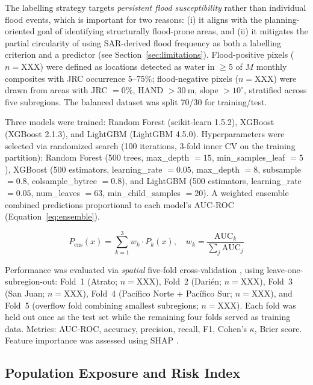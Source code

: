 \documentclass{article}
\begin{document}
The labelling strategy targets \textit{persistent flood susceptibility} rather than individual flood events, which is important for two reasons: (i) it aligns with the planning-oriented goal of identifying structurally flood-prone areas, and (ii) it mitigates the partial circularity of using SAR-derived flood frequency as both a labelling criterion and a predictor (see Section~\ref{sec:limitations}). Flood-positive pixels ($n = \text{XXX}$) were defined as locations detected as water in $\geq$5 of $M$ monthly composites with JRC occurrence 5--75\%; flood-negative pixels ($n = \text{XXX}$) were drawn from areas with JRC $= 0\%$, HAND $> \SI{30}{\metre}$, slope $> 10^{\circ}$, stratified across five subregions. The balanced dataset was split 70/30 for training/test.

Three models were trained: Random Forest \citep{Breiman2001} (scikit-learn 1.5.2), XGBoost \citep{Chen2016} (XGBoost 2.1.3), and LightGBM \citep{Ke2017} (LightGBM 4.5.0). Hyperparameters were selected via randomized search (100 iterations, 3-fold inner CV on the training partition): Random Forest (500 trees, max\_depth $= 15$, min\_samples\_leaf $= 5$), XGBoost (500 estimators, learning\_rate $= 0.05$, max\_depth $= 8$, subsample $= 0.8$, colsample\_bytree $= 0.8$), and LightGBM (500 estimators, learning\_rate $= 0.05$, num\_leaves $= 63$, min\_child\_samples $= 20$). A weighted ensemble combined predictions proportional to each model's AUC-ROC (Equation~\ref{eq:ensemble}).

\begin{equation}
    P_{\text{ens}}(x) = \sum_{k=1}^{3} w_k \cdot P_k(x), \quad w_k = \frac{\text{AUC}_k}{\sum_{j} \text{AUC}_j}
    \label{eq:ensemble}
\end{equation}

Performance was evaluated via \textit{spatial} five-fold cross-validation \citep{Roberts2017}, using leave-one-subregion-out: Fold~1 (Atrato; $n = \text{XXX}$), Fold~2 (Dari\'en; $n = \text{XXX}$), Fold~3 (San Juan; $n = \text{XXX}$), Fold~4 (Pac\'ifico Norte + Pac\'ifico Sur; $n = \text{XXX}$), and Fold~5 (overflow fold combining smallest subregions; $n = \text{XXX}$). Each fold was held out once as the test set while the remaining four folds served as training data. Metrics: AUC-ROC, accuracy, precision, recall, F1, Cohen's $\kappa$, Brier score. Feature importance was assessed using SHAP \citep{Lundberg2017}.

\subsection{Population Exposure and Risk Index}
\end{document}
